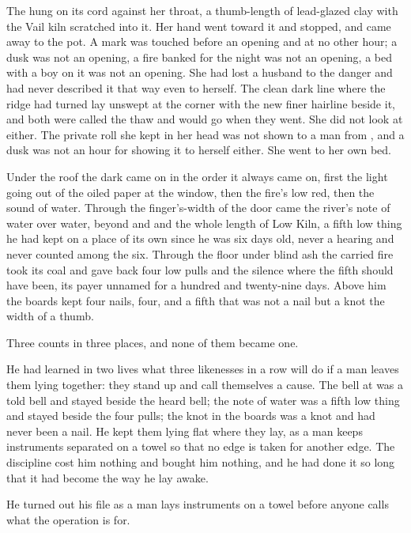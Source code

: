The  hung on its cord against her throat, a thumb-length of lead-glazed clay with the Vail kiln scratched into it. Her hand went toward it and stopped, and came away to the pot. A mark was touched before an opening and at no other hour; a dusk was not an opening, a fire banked for the night was not an opening, a bed with a boy on it was not an opening. She had lost a husband to the danger and had never described it that way even to herself. The clean dark line where the  ridge had turned lay unswept at the corner with the new finer hairline beside it, and both were called the thaw and would go when they went. She did not look at either. The private roll she kept in her head was not shown to a man from , and a dusk was not an hour for showing it to herself either. She went to her own bed.

\scenebreak

Under the roof the dark came on in the order it always came on, first the light going out of the oiled paper at the window, then the fire's low red, then the sound of water. Through the finger's-width of the door came the river's note of water over water, beyond  and  and the whole length of Low Kiln, a fifth low thing he had kept on a place of its own since he was six days old, never a hearing and never counted among the six. Through the floor under blind ash the carried fire took its coal and gave back four low pulls and the silence where the fifth should have been, its payer unnamed for a hundred and twenty-nine days. Above him the boards kept four nails, four, and a fifth that was not a nail but a knot the width of a thumb.

Three counts in three places, and none of them became one.

He had learned in two lives what three likenesses in a row will do if a man leaves them lying together: they stand up and call themselves a cause. The bell at  was a told bell and stayed beside the heard bell; the note of water was a fifth low thing and stayed beside the four pulls; the knot in the boards was a knot and had never been a nail. He kept them lying flat where they lay, as a man keeps instruments separated on a towel so that no edge is taken for another edge. The discipline cost him nothing and bought him nothing, and he had done it so long that it had become the way he lay awake.

He turned out his file as a man lays instruments on a towel before anyone calls what the operation is for.

